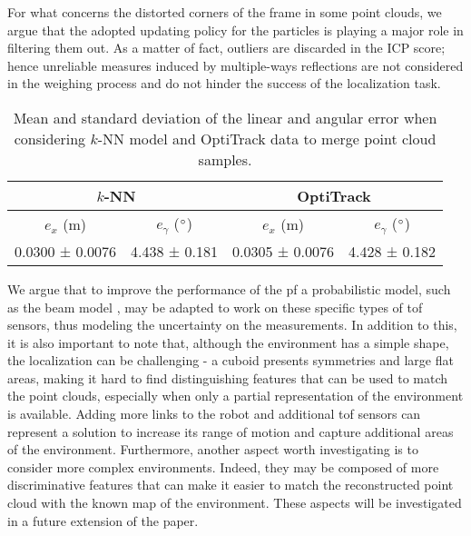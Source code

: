 For what concerns the distorted corners of the frame in some point clouds, we argue that the adopted updating policy for the particles is playing a major role in filtering them out. As a matter of fact, outliers are discarded in the ICP score; hence unreliable measures induced by multiple-ways reflections are not considered in the weighing process and do not hinder the success of the localization task.

\begin{table}[t!]
\label{tab:table_errors}
\caption{Mean and standard deviation of the linear and angular error when considering $k$-NN model and OptiTrack data to merge point cloud samples.}
\begin{tabular}{|cc|cc|}
\hline
\multicolumn{2}{|c|}{$k$-NN}                                       & \multicolumn{2}{c|}{OptiTrack}                                 \\ \hline
\multicolumn{1}{|c|}{$e_x$ (m)}           & $e_\gamma$ ($\degree$) & \multicolumn{1}{c|}{$e_x$ (m)}           & $e_\gamma$ ($\degree$) \\ \hline
\multicolumn{1}{|c|}{0.0300 ± 0.0076} & 4.438 ± 0.181            & \multicolumn{1}{c|}{0.0305 ± 0.0076} & 4.428 ± 0.182            \\ \hline
\end{tabular}
\label{tab:table_errors}
\end{table}


We argue that to improve the performance of the \gls{pf} a probabilistic model, such as the beam model \cite{thrun2002probabilistic}, may be adapted to work on these specific types of \gls{tof} sensors, thus modeling the uncertainty on the measurements.
In addition to this, it is also important to note that, although the environment has a simple shape, the localization can be challenging - a cuboid presents symmetries and large flat areas, making it hard to find distinguishing features that can be used to match the point clouds, especially when only a partial representation of the environment is available. Adding more links to the robot and additional \gls{tof} sensors can represent a solution to increase its range of motion and capture additional areas of the environment. Furthermore, another aspect worth investigating is to consider more complex environments. Indeed, they may be composed of more discriminative features that can make it easier to match the reconstructed point cloud with the known map of the environment. These aspects will be investigated in a future extension of the paper.
